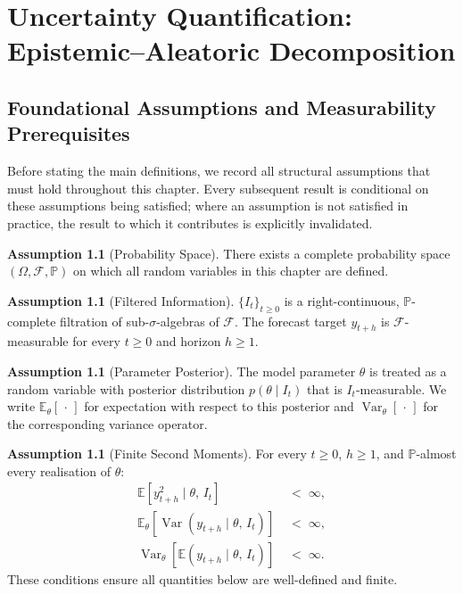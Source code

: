 \documentclass[12pt,openany]{book}
\newcommand{\calI}{\mathcal{I}}
\newcommand{\E}{\mathbb{E}}
\numberwithin{equation}{chapter}
\theoremstyle{plain}
\theoremstyle{definition}
\newtheorem{assumption}[theorem]{Assumption}
\theoremstyle{remark}
\numberwithin{equation}{chapter}
\theoremstyle{plain}
\DeclareMathOperator{\Var}{Var}
\def\calI{I}%
\begin{document}
\chapter{Uncertainty Quantification:\texorpdfstring{\\}{ }Epistemic--Aleatoric Decomposition}
\label{ch:uncertainty}

\section{Foundational Assumptions and Measurability Prerequisites}

Before stating the main definitions, we record all structural
assumptions that must hold throughout this chapter.  Every subsequent
result is conditional on these assumptions being satisfied; where an
assumption is not satisfied in practice, the result to which it
contributes is explicitly invalidated.

\begin{assumption}[Probability Space]
\label{asm:prob-space}
There exists a complete probability space $(\Omega, \mathcal{F},
\mathbb{P})$ on which all random variables in this chapter are defined.
\end{assumption}

\begin{assumption}[Filtered Information]
\label{asm:filtration}
$\{\calI_t\}_{t \geq 0}$ is a right-continuous, $\mathbb{P}$-complete
filtration of sub-$\sigma$-algebras of $\mathcal{F}$.  The forecast
target $y_{t+h}$ is $\mathcal{F}$-measurable for every $t \geq 0$ and
horizon $h \geq 1$.
\end{assumption}

\begin{assumption}[Parameter Posterior]
\label{asm:posterior}
The model parameter $\theta$ is treated as a random variable with
posterior distribution $p(\theta \mid \calI_t)$ that is
$\calI_t$-measurable.  We write $\E_\theta[\,\cdot\,]$ for expectation
with respect to this posterior and $\Var_\theta[\,\cdot\,]$ for the
corresponding variance operator.
\end{assumption}

\begin{assumption}[Finite Second Moments]
\label{asm:finite-moments}
For every $t \geq 0$, $h \geq 1$, and $\mathbb{P}$-almost every
realisation of $\theta$:
\begin{align}
  \E\!\left[y_{t+h}^{2} \mid \theta,\, \calI_t\right] &\;<\; \infty,
  \label{eq:finite-cond}\\
  \E_\theta\!\left[\Var(y_{t+h} \mid \theta,\, \calI_t)\right]
    &\;<\; \infty,
  \label{eq:finite-aleatoric}\\
  \Var_\theta\!\left[\E(y_{t+h} \mid \theta,\, \calI_t)\right]
    &\;<\; \infty.
  \label{eq:finite-epistemic}
\end{align}
These conditions ensure all quantities below are well-defined and finite.
\end{assumption}
\end{document}
